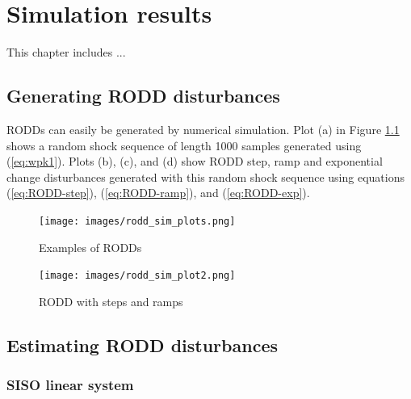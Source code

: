 \chapter{Simulation results}
\label{chap-simulation}

This chapter includes ...

\section{Generating RODD disturbances}

RODDs can easily be generated by numerical simulation.  Plot (a) in Figure \ref{fig:rodd-sim-plots} shows a random shock sequence of length 1000 samples generated using (\ref{eq:wpk1}). Plots (b), (c), and (d) show RODD step, ramp and exponential change disturbances generated with this random shock sequence using equations (\ref{eq:RODD-step}), (\ref{eq:RODD-ramp}), and (\ref{eq:RODD-exp}). 



\begin{figure}[htp]
	\centering
	\texttt{[image: images/rodd\_sim\_plots.png]}
	\caption{Examples of RODDs}
	\label{fig:rodd-sim-plots}
\end{figure}

\begin{figure}[htp]
	\centering
	\texttt{[image: images/rodd\_sim\_plot2.png]}
	\caption{RODD with steps and ramps}
	\label{fig:rodd-sim-plot2}
\end{figure}


\section{Estimating RODD disturbances}

\subsection{SISO linear system}

